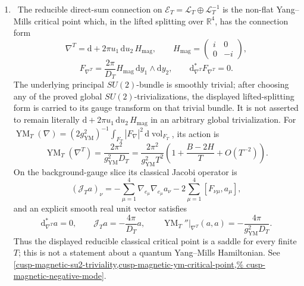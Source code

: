 \begin{enumerate}[leftmargin=1.8em]
\item \Verified\ The reducible direct-sum connection on
\(\mathscr E_T=\mathscr L_T\oplus\mathscr L_T^{-1}\) is the non-flat
Yang--Mills critical point which, in the lifted splitting over
\(\mathbb R^4\), has the connection form
\[
 \nabla^T=\mathrm d+2\pi u_1\,\mathrm du_2\,H_{\mathrm{mag}},\qquad
 H_{\mathrm{mag}}=\begin{pmatrix}i&0\\0&-i\end{pmatrix},
\]
\[
 F_{\nabla^T}
 =\frac{2\pi}{D_T}H_{\mathrm{mag}}\,\mathrm dy_1\wedge\mathrm dy_2,
 \qquad \mathrm d_{\nabla^T}^*F_{\nabla^T}=0.
\]
The underlying principal \(SU(2)\)-bundle is smoothly trivial; after
choosing any of the proved global \(SU(2)\)-trivializations, the displayed
lifted-splitting form is carried to its gauge transform on that trivial
bundle.  It is not asserted to remain literally
\(\mathrm d+2\pi u_1\,\mathrm du_2\,H_{\mathrm{mag}}\) in an arbitrary
global trivialization.
For
\(\operatorname{YM}_T(\nabla)
=(2g_{\mathrm{YM}}^2)^{-1}\int_{F_T}|F_\nabla|^2\,
\mathrm d\operatorname{vol}_{F_T}\), its action is
\[
 \operatorname{YM}_T(\nabla^T)
 =\frac{2\pi^2}{g_{\mathrm{YM}}^2D_T}
 =\frac{2\pi^2}{g_{\mathrm{YM}}^2T^2}
 \left(1+\frac{B-2H}{T}+O(T^{-2})\right).
\]
On the background-gauge slice its classical Jacobi operator is
\[
 (\mathcal J_Ta)_\nu
 =-\sum_{\mu=1}^4\nabla_{e_\mu}\nabla_{e_\mu}a_\nu
  -2\sum_{\mu=1}^4[F_{\nu\mu},a_\mu],
\]
and an explicit smooth real unit vector satisfies
\[
 \mathrm d_{\nabla^T}^*a=0,\qquad
 \mathcal J_Ta=-\frac{4\pi}{D_T}a,\qquad
 \operatorname{YM}_T''|_{\nabla^T}(a,a)
 =-\frac{4\pi}{g_{\mathrm{YM}}^2D_T}.
\]
Thus the displayed reducible classical critical point is a saddle for every
finite \(T\); this is not a statement about a quantum Yang--Mills
Hamiltonian.  See
\cref{cusp-magnetic-su2-triviality,cusp-magnetic-ym-critical-point,%
cusp-magnetic-negative-mode}.


\end{enumerate}
